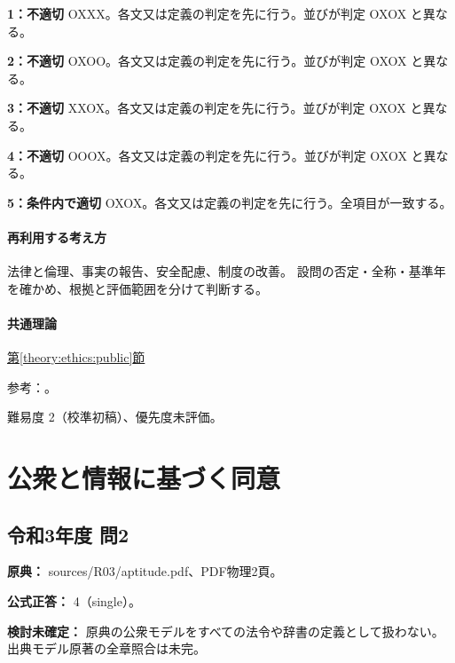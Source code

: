 \noindent\textbf{1：不適切} OXXX。各文又は定義の判定を先に行う。並びが判定 OXOX と異なる。\par

\noindent\textbf{2：不適切} OXOO。各文又は定義の判定を先に行う。並びが判定 OXOX と異なる。\par

\noindent\textbf{3：不適切} XXOX。各文又は定義の判定を先に行う。並びが判定 OXOX と異なる。\par

\noindent\textbf{4：不適切} OOOX。各文又は定義の判定を先に行う。並びが判定 OXOX と異なる。\par

\noindent\textbf{5：条件内で適切} OXOX。各文又は定義の判定を先に行う。全項目が一致する。\par

\paragraph{再利用する考え方} 法律と倫理、事実の報告、安全配慮、制度の改善。 設問の否定・全称・基準年を確かめ、根拠と評価範囲を分けて判断する。

\paragraph{共通理論} \hyperref[theory:ethics:public]{第\ref*{theory:ethics:public}節}

\par 参考：\cite{ipej_ethics2011}。

\par 難易度 2（校準初稿）、優先度未評価。

\section{公衆と情報に基づく同意}

\subsection{令和3年度 問2}
\label{q:r03-reg-apt-02}

\noindent\textbf{原典：} sources/R03/aptitude.pdf、PDF物理2頁。

\textbf{公式正答：} 4（single）。

\par\textbf{検討未確定：} 原典の公衆モデルをすべての法令や辞書の定義として扱わない。出典モデル原著の全章照合は未完。

